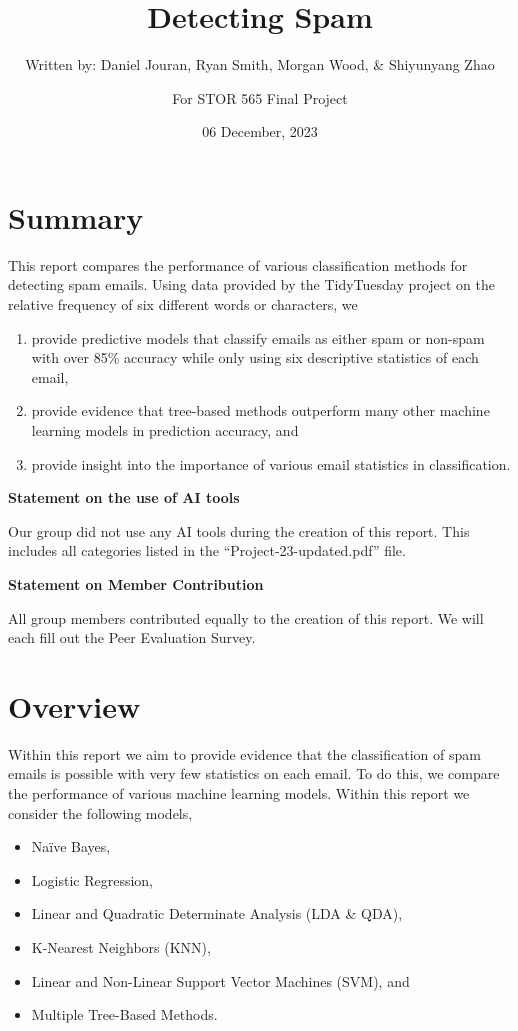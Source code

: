 \documentclass[
]{article}
\title{Detecting Spam}
\author{Written by: Daniel Jouran, Ryan Smith, Morgan Wood, \& Shiyunyang Zhao \and For STOR 565 Final Project}
\date{06 December, 2023}
\begin{document}
\maketitle

{
\setcounter{tocdepth}{2}
\tableofcontents
}
\hypertarget{summary}{%
\section*{Summary}\label{summary}}

This report compares the performance of various classification methods for detecting spam emails. Using data provided by the TidyTuesday project on the relative frequency of six different words or characters, we

\begin{enumerate}
\def\labelenumi{\arabic{enumi}.}
\item
  provide predictive models that classify emails as either spam or non-spam with over 85\% accuracy while only using six descriptive statistics of each email,
\item
  provide evidence that tree-based methods outperform many other machine learning models in prediction accuracy, and
\item
  provide insight into the importance of various email statistics in classification. \n
\end{enumerate}

\textbf{Statement on the use of AI tools}

Our group did not use any AI tools during the creation of this report. This includes all categories listed in the ``Project-23-updated.pdf'' file. \n

\textbf{Statement on Member Contribution}

All group members contributed equally to the creation of this report. We will each fill out the Peer Evaluation Survey. \n

\hypertarget{overview}{%
\section{Overview}\label{overview}}

Within this report we aim to provide evidence that the classification of spam emails is possible with very few statistics on each email. To do this, we compare the performance of various machine learning models. Within this report we consider the following models,

\begin{itemize}
\item
  Naïve Bayes,
\item
  Logistic Regression,
\item
  Linear and Quadratic Determinate Analysis (LDA \& QDA),
\item
  K-Nearest Neighbors (KNN),
\item
  Linear and Non-Linear Support Vector Machines (SVM), and
\item
  Multiple Tree-Based Methods.
\end{itemize}
\end{document}
